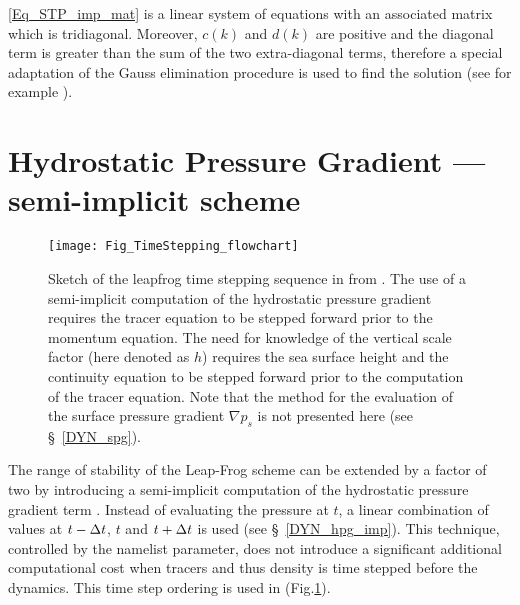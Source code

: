 \documentclass[NEMO_book]{subfiles}
\begin{document}
\eqref{Eq_STP_imp_mat} is a linear system of equations with an associated 
matrix which is tridiagonal. Moreover, $c(k)$ and $d(k)$ are positive and the diagonal 
term is greater than the sum of the two extra-diagonal terms, therefore a special 
adaptation of the Gauss elimination procedure is used to find the solution 
(see for example \citet{Richtmyer1967}).



\section{Hydrostatic Pressure Gradient --- semi-implicit scheme}
\label{STP_hpg_imp}

\begin{figure}[!t] 	  \begin{center}
\texttt{[image: Fig\_TimeStepping\_flowchart]}
\caption{ 	\label{Fig_TimeStep_flowchart}
Sketch of the leapfrog time stepping sequence in \NEMO from \citet{Leclair_Madec_OM09}. 
The use of a semi-implicit computation of the hydrostatic pressure gradient requires
the tracer equation to be stepped forward prior to the momentum equation. 
The need for knowledge of the vertical scale factor (here denoted as $h$)
requires the sea surface height and the continuity equation to be stepped forward
prior to the computation of the tracer equation.
Note that the method for the evaluation of the surface pressure gradient $\nabla p_s$ is not presented here 
(see \S~\ref{DYN_spg}). }
\end{center}   \end{figure}

The range of stability of the Leap-Frog scheme can be extended by a factor of two
by introducing a semi-implicit computation of the hydrostatic pressure gradient term
\citep{Brown_Campana_MWR78}. Instead of evaluating the pressure at $t$, a linear 
combination of values at $t-\Delta t$, $t$ and $t+\Delta t$ is used (see \S~\ref{DYN_hpg_imp}).  
This technique, controlled by the  namelist parameter, does not 
introduce a significant additional computational cost when tracers and thus density 
is time stepped before the dynamics. This time step ordering is used in \NEMO 
(Fig.\ref{Fig_TimeStep_flowchart}).
\end{document}
